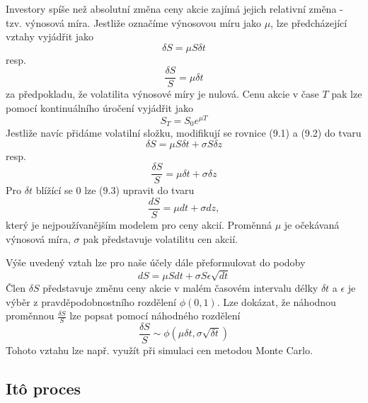 \documentclass[a4paper]{book}
\begin{document}
Investory spíše než absolutní změna ceny akcie zajímá jejich relativní změna - tzv. výnosová míra. Jestliže označíme výnosovou míru jako $\mu$, lze předcházející vztahy vyjádřit jako
\begin{equation}
\delta S = \mu S \delta t
\end{equation}
resp.
\begin{equation}
\frac{\delta S}{S} = \mu \delta t
\end{equation}
za předpokladu, že volatilita výnosové míry je nulová. Cenu akcie v čase $T$ pak lze pomocí kontinuálního úročení vyjádřit jako
\begin{equation*}
S_T = S_0 e^{\mu T}
\end{equation*}
Jestliže navíc přidáme volatilní složku, modifikují se rovnice (9.1) a (9.2) do tvaru
\begin{equation*}
\delta S = \mu S \delta t + \sigma S \delta z
\end{equation*}
resp.
\begin{equation}
\frac{\delta S}{S} = \mu \delta t + \sigma \delta z
\end{equation}
Pro $\delta t$ blížící se 0 lze (9.3) upravit do tvaru
\begin{equation*}
\frac{d S}{S}=\mu d t + \sigma d z,
\end{equation*}
který je nejpoužívanějším modelem pro ceny akcií. Proměnná $\mu$ je očekávaná výnosová míra, $\sigma$ pak představuje volatilitu cen akcií.

Výše uvedený vztah lze pro naše účely dále přeformulovat do podoby
\begin{equation}
d S = \mu S d t + \sigma S \epsilon \sqrt{d t}
\end{equation}
Člen $\delta S$ představuje změnu ceny akcie v malém časovém intervalu délky $\delta t$ a $\epsilon$ je výběr z pravděpodobnostního rozdělení $\phi (0,1)$.
Lze dokázat, že náhodnou proměnnou $\frac{\delta S}{S}$ lze popsat pomocí náhodného rozdělení
\begin{equation*}
\frac{\delta S}{S} \sim \phi(\mu \delta t, \sigma \sqrt{\delta t})
\end{equation*}
Tohoto vztahu lze např. využít při simulaci cen metodou Monte Carlo.

\subsection{It\^o proces}
\end{document}

